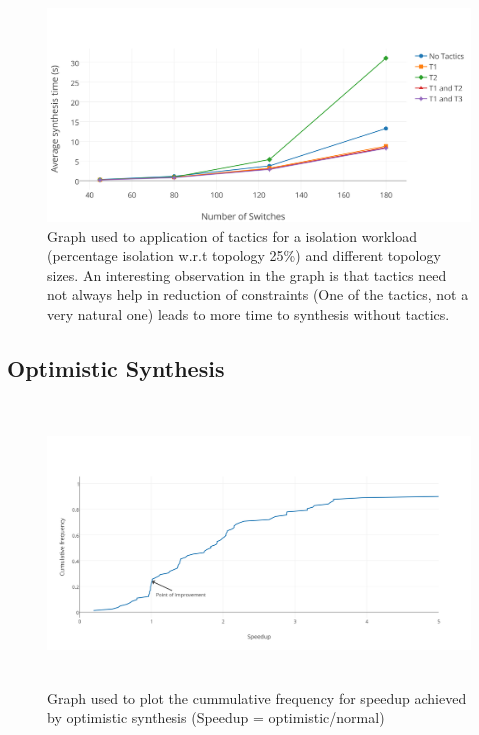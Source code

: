 \begin{figure}
	\includegraphics[width=\columnwidth]{figures/isolation-tactics.png}
	\caption{Graph used to application of tactics for a isolation workload (percentage isolation w.r.t topology 25\%) and different topology sizes. An interesting observation in the graph is that tactics need not always help in reduction of constraints (One of the tactics, not  a very natural one) leads to more time to synthesis without tactics.}
	\label{fig:isolation-tactics}
\end{figure}

\subsection{Optimistic Synthesis}
\begin{figure}
	\includegraphics[height=7.5cm]{figures/opt-cdf.png}
	\caption{Graph used to plot the cummulative frequency for speedup achieved by optimistic synthesis (Speedup = optimistic/normal)}
	\label{fig:opt-cdf}
\end{figure}


